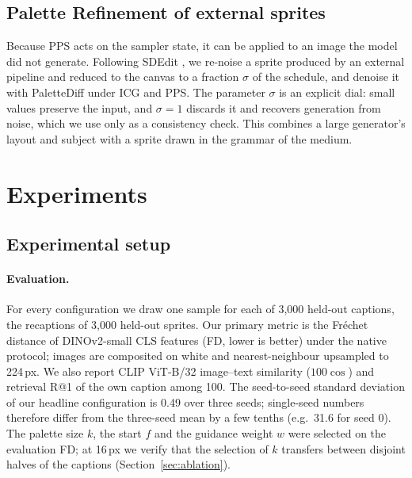 \documentclass{article} %
\newcommand{\ours}{PaletteDiff}
\begin{document}
\subsection{Palette Refinement of external sprites}
\label{sec:refinemethod}

Because PPS acts on the sampler state, it can be applied to an image the model did not generate. Following SDEdit
\citep{Meng2022sdedit}, we re-noise a sprite produced by an external pipeline and reduced to the canvas to a fraction
$\sigma$ of the schedule, and denoise it with \ours{} under ICG and PPS. The parameter $\sigma$ is an explicit dial:
small values preserve the input, and $\sigma=1$ discards it and recovers generation from noise, which we use only as a
consistency check. This combines a large generator's layout and subject with a sprite drawn in the grammar of the
medium.

\section{Experiments}
\label{sec:exp}

\subsection{Experimental setup}
\label{sec:protocol}

\paragraph{Evaluation.}
For every configuration we draw one sample for each of 3{,}000 held-out captions, the recaptions of 3{,}000 held-out
sprites. Our primary metric is the Fréchet distance of DINOv2-small CLS features \citep{Oquab2023,Stein2023} (FD, lower
is better) under the native protocol; images are composited on white and nearest-neighbour upsampled to 224\,px. We
also report CLIP ViT-B/32 image--text similarity ($100\cos$) and retrieval R@1 of the own caption among 100. The
seed-to-seed standard deviation of our headline configuration is 0.49 over three seeds; single-seed numbers therefore
differ from the three-seed mean by a few tenths (e.g.\ 31.6 for seed 0). The palette size $k$, the start $f$ and the
guidance weight $w$ were selected on the evaluation FD; at 16\,px we verify that the selection of $k$ transfers between
disjoint halves of the captions (Section~\ref{sec:ablation}).
\end{document}
